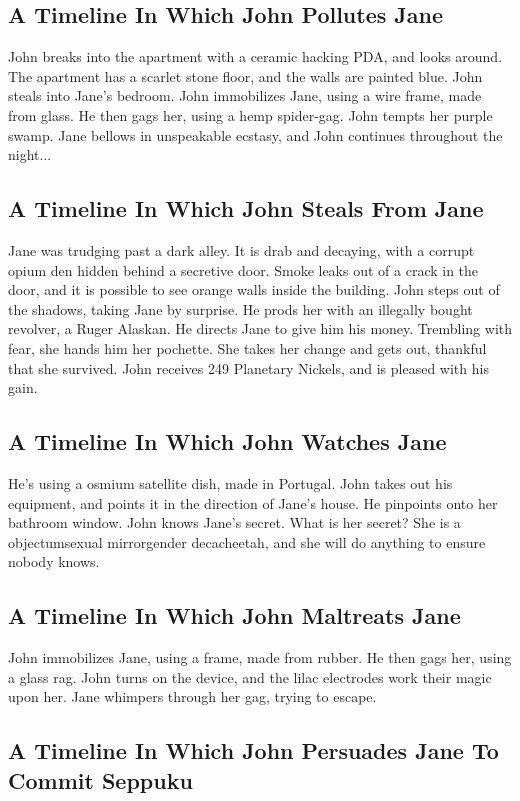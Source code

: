 \documentclass{article}
\begin{document}
\subsection{A Timeline In Which John Pollutes Jane}


John breaks into the apartment with a ceramic hacking PDA, and looks around.
The apartment has a scarlet stone floor, and the walls are painted blue.
John steals into Jane's bedroom.
John immobilizes Jane, using a wire frame, made from glass.
He then gags her, using a hemp spider{-}gag.
John tempts her purple swamp.
Jane bellows in unspeakable ecstasy, and John continues throughout the night...
\subsection{A Timeline In Which John Steals From Jane}


Jane was trudging past a dark alley.
It is drab and decaying, with a corrupt opium den hidden behind a secretive door.
Smoke leaks out of a crack in the door, and it is possible to see orange walls inside the building.
John steps out of the shadows, taking Jane by surprise.
He prods her with an illegally bought revolver, a Ruger Alaskan.
He directs Jane to give him his money.
Trembling with fear, she hands him her pochette.
She takes her change and gets out, thankful that she survived.
John receives 249 Planetary Nickels, and is pleased with his gain.
\subsection{A Timeline In Which John Watches Jane}


He's using a osmium satellite dish, made in Portugal.
John takes out his equipment, and points it in the direction of Jane's house. He pinpoints onto her bathroom window.
John knows Jane's secret. What is her secret? She is a objectumsexual mirrorgender decacheetah, and she will do anything to ensure nobody knows.
\subsection{A Timeline In Which John Maltreats Jane}


John immobilizes Jane, using a frame, made from rubber.
He then gags her, using a glass rag.
John turns on the device, and the lilac electrodes work their magic upon her.
Jane whimpers through her gag, trying to escape.
\subsection{A Timeline In Which John Persuades Jane To Commit Seppuku}
\end{document}
